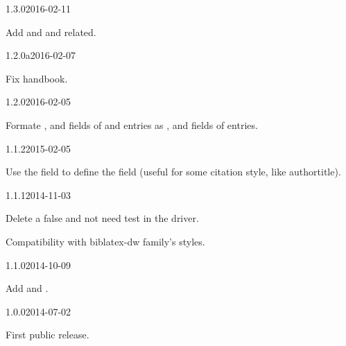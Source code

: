\documentclass{ltxdockit}[2011/03/25]
\begin{document}
\begin{changelog}

\begin{release}{1.3.0}{2016-02-11}
\item Add  and  and related.
\end{release}

\begin{release}{1.2.0a}{2016-02-07}
\item Fix handbook.
\end{release}

\begin{release}{1.2.0}{2016-02-05}
\item Formate   ,  and  fields of   and  entries as ,  and  fields of  entries.
\end{release}

\begin{release}{1.1.2}{2015-02-05}
\item Use the  field to define the  field (useful for some citation style, like authortitle).
\end{release}

\begin{release}{1.1.1}{2014-11-03}
\item Delete a false and not need test in the driver.
\item Compatibility with biblatex-dw family's styles.
\end{release}
\begin{release}{1.1.0}{2014-10-09}
\item Add  and .
\end{release}

\begin{release}{1.0.0}{2014-07-02}
\item First public release.
\end{release}
\end{changelog}
\end{document}
